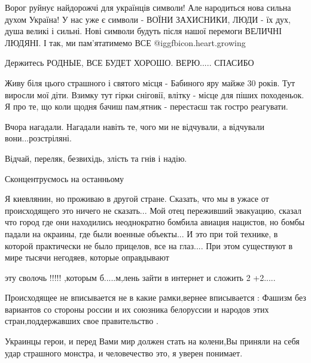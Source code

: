  
 
 
 
 
\zzSecCmt

\begin{itemize} %

Ворог руйнує найдорожчі для українців символи! Але народиться нова сильна духом
Україна! У нас уже є символи - ВОЇНИ ЗАХИСНИКИ, ЛЮДИ - їх дух, душа великі і
сильні. Нові символи будуть після нашої перемоги ВЕЛИЧНІ ЛЮДЯНІ. І так, ми
пам'ятатимемо ВСЕ @igg{fbicon.heart.growing} 


Держитесь РОДНЫЕ, ВСЕ БУДЕТ ХОРОШО. ВЕРЮ..... СПАСИБО


Живу біля цього страшного і святого місця - Бабиного яру майже 30 років. Тут
виросли мої діти. Взимку тут гірки сніговії, влітку - місце для піших
походеньок. Я про те, що коли щодня бачиш пам,ятник - перестаєш так гостро
реагувати.

Вчора нагадали. Нагадали навіть те, чого ми не відчували, а відчували
вони...розстріляні.

Відчай, переляк, безвихідь, злість та гнів і надію.

Сконцентруємось на останньому


Я киевлянин, но проживаю в другой стране. Сказать, что мы в ужасе от
происходящего это ничего не сказать... Мой отец переживший эвакуацию, сказал
что город где они находились неоднократно бомбила авиация нацистов, но бомбы
падали на окраины, где были военные объекты... И это при той технике, в которой
практически не было прицелов, все на глаз.... При этом существуют в мире тысячи
негодяев, которые оправдывают

эту сволочь !!!!! ,которым б.....м,лень зайти в интернет и сложить 2 +2.....

Происходящее не вписывается не в какие рамки,вернее вписывается : Фашизм без
вариантов со стороны россии и их союзника белоруссии и народов этих
стран,поддержавших свое правительство .

Украинцы герои, и перед Вами мир должен стать на колени,Вы приняли на себя удар
страшного монстра, и человечество это, я уверен понимает.


\end{itemize}
